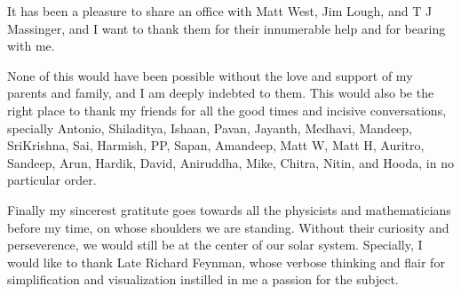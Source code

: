 \noindent It has been a pleasure to share an office with Matt West, Jim Lough, 
and T J Massinger, and I want to thank them for their innumerable help and 
for bearing with me.


\noindent None of this would have been possible without the love and support of
my parents and family, and I am deeply indebted to them. This would also 
be the right place to thank my friends for all the good times and incisive
conversations, specially Antonio, Shiladitya, Ishaan, Pavan, Jayanth, Medhavi,
Mandeep, SriKrishna, Sai, Harmish, PP, Sapan, Amandeep, Matt W, Matt H, 
Auritro, Sandeep, Arun, Hardik, David, Aniruddha, Mike, Chitra, 
Nitin, and Hooda, in no particular order.


\noindent Finally my sincerest gratitute goes towards all the physicists and mathematicians
before my time, on whose shoulders we are standing. 
Without their curiosity and perseverence, we would still be at the center of our
solar system.
Specially, I would like to thank Late Richard Feynman, whose verbose thinking
and flair for simplification and visualization instilled in me a passion for the
subject.

